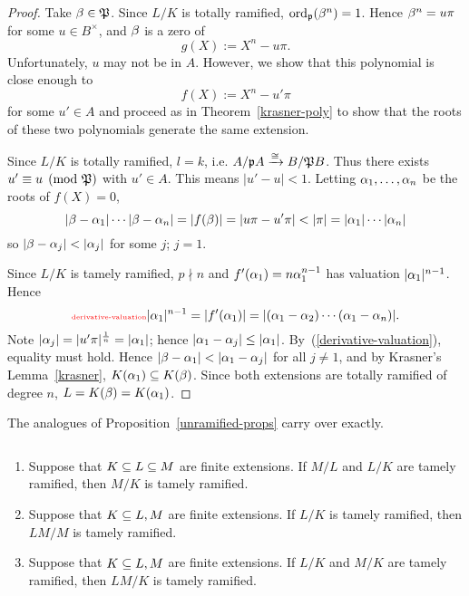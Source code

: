 \begin{proof}
%
Take $\beta\in \mathfrak{P}$. Since $L/K$ is totally ramified, $\operatorname{ord}_{\mathfrak{p}}(\beta^n)=1$. Hence $\beta^n=u\pi$ for some $u\in B^{\times}$, and $\beta$ is a zero of
\[
g(X):=X^n-u\pi.
\]
Unfortunately, $u$ may not be in $A$. However, we show that this polynomial is close enough to 
\[
f(X):=X^n-u'\pi
\]
for some $u'\in A$ and proceed as in Theorem~\ref{krasner-poly} to show that the roots of these two polynomials generate the same extension.

Since $L/K$ is totally ramified, $l=k$, i.e. $A/\mathfrak{p} A\xrightarrow{\cong} B/\mathfrak{P} B$. Thus there exists $u'\equiv u\pmod{\mathfrak{P}}$ with $u'\in A$. This means $|u'-u|<1$. Letting $\alpha_1,\ldots, \alpha_n$ be the roots of $f(X)=0$,
\[
|\be-\al_1|\cdots |\be-\al_n|=|f(\be)|=|u\pi-u'\pi|<|\pi|=|\al_1|\cdots |\al_n|
\]
so $|\be-\al_j|<|\al_j|$ for some $j$; \wog{} $j=1$.

Since $L/K$ is tamely ramified, $p\nmid n$ and  $f'(\alpha_1)=n\alpha_1^{n-1}$ has valuation $|\alpha_1|^{n-1}$. Hence
\begin{equation}\llabel{derivative-valuation}
|\al_1|^{n-1}=|f'(\al_1)|=|(\al_1-\al_2)\cdots (\al_1-\al_n)|.
\end{equation}
Note $|\alpha_j|=|u'\pi|^{\frac{1}{n}}=|\alpha_1|$; hence $|\alpha_1-\alpha_j|\le |\alpha_1|$. By~(\ref{derivative-valuation}), equality must hold. Hence $|\be-\al_1|<|\al_1-\al_j|$ for all $j\ne 1$, and by Krasner's Lemma~\ref{krasner}, $K(\alpha_1)\subseteq K(\beta)$. Since both extensions are totally ramified of degree $n$, $L=K(\beta)=K(\alpha_1)$.
\end{proof}
The analogues of Proposition~\ref{unramified-props} carry over exactly.
\begin{pr}$\,$
\begin{enumerate}
\item
Suppose that $K\subseteq L\subseteq M$ are finite extensions. If $M/L$ and $L/K$ are tamely ramified, then $M/K$ is tamely ramified.
\item
Suppose that $K\subseteq L,M$ are finite extensions. If $L/K$ is tamely ramified, then $LM/M$ is tamely ramified.
\item
Suppose that $K\subseteq L,M$ are finite extensions. If $L/K$ and $M/K$ are tamely ramified, then $LM/K$ is tamely ramified.
\end{enumerate}
\end{pr}
